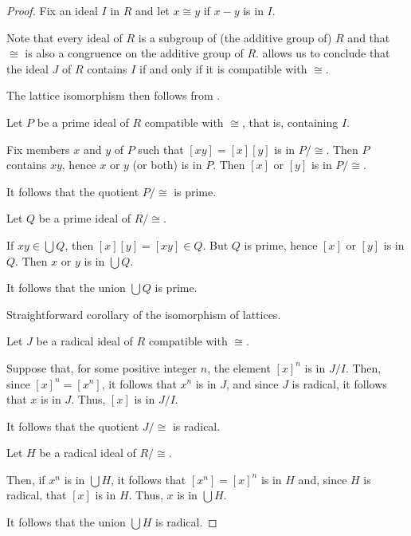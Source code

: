 \begin{proof}
  Fix an ideal \( I \) in \( R \) and let \( x \cong y \) if \( x - y \) is in \( I \).

   Note that every ideal of \( R \) is a subgroup of (the additive group of) \( R \) and that \( {\cong} \) is also a congruence on the additive group of \( R \).  allows us to conclude that the ideal \( J \) of \( R \) contains \( I \) if and only if it is compatible with \( {\cong} \).

  The lattice isomorphism then follows from .


  \SufficiencySubProof* Let \( P \) be a prime ideal of \( R \) compatible with \( {\cong} \), that is, containing \( I \).

  Fix members \( x \) and \( y \) of \( P \) such that \( [xy] = [x][y] \) is in \( P / {\cong} \). Then \( P \) contains \( xy \), hence \( x \) or \( y \) (or both) is in \( P \). Then \( [x] \) or \( [y] \) is in \( P / {\cong} \).

  It follows that the quotient \( P / {\cong} \) is prime.

  \NecessitySubProof* Let \( Q \) be a prime ideal of \( R / {\cong} \).

  If \( xy \in \bigcup Q \), then \( [x][y] = [xy] \in Q \). But \( Q \) is prime, hence \( [x] \) or \( [y] \) is in \( Q \). Then \( x \) or \( y \) is in \( \bigcup Q \).

  It follows that the union \( \bigcup Q \) is prime.

   Straightforward corollary of the isomorphism of lattices.


  \SufficiencySubProof* Let \( J \) be a radical ideal of \( R \) compatible with \( {\cong} \).

  Suppose that, for some positive integer \( n \), the element \( [x]^n \) is in \( J / I \). Then, since \( [x]^n = [x^n] \), it follows that \( x^n \) is in \( J \), and since \( J \) is radical, it follows that \( x \) is in \( J \). Thus, \( [x] \) is in \( J / I \).

  It follows that the quotient \( J / {\cong} \) is radical.

  \NecessitySubProof* Let \( H \) be a radical ideal of \( R / {\cong} \).

  Then, if \( x^n \) is in \( \bigcup H \), it follows that \( [x^n] = [x]^n \) is in \( H \) and, since \( H \) is radical, that \( [x] \) is in \( H \). Thus, \( x \) is in \( \bigcup H \).

  It follows that the union \( \bigcup H \) is radical.
\end{proof}


